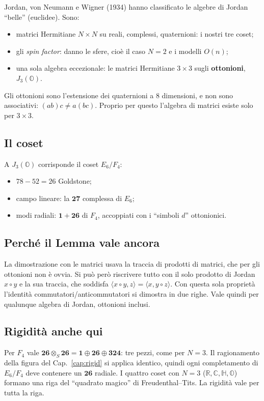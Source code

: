 \documentclass[11pt,a4paper]{article}
\numberwithin{equation}{section}
\theoremstyle{remark}
\newcommand{\R}{\mathbb{R}}
\begin{document}
Jordan, von Neumann e Wigner (1934) hanno classificato le algebre di Jordan ``belle'' (euclidee). Sono:
\begin{itemize}[nosep]
\item matrici Hermitiane $N\times N$ su reali, complessi, quaternioni: i nostri tre coset;
\item gli \emph{spin factor}: danno le sfere, cioè il caso $N=2$ e i modelli $O(n)$;
\item una sola algebra eccezionale: le matrici Hermitiane $3\times3$ sugli \textbf{ottonioni}, $J_3(\mathbb O)$.
\end{itemize}
Gli ottonioni sono l'estensione dei quaternioni a 8 dimensioni, e non sono associativi: $(ab)c\ne a(bc)$. Proprio per questo l'algebra di matrici esiste solo per $3\times3$.

\subsection{Il coset}

A $J_3(\mathbb O)$ corrisponde il coset $E_6/F_4$:
\begin{itemize}[nosep]
\item $78-52=26$ Goldstone;
\item campo lineare: la $\mathbf{27}$ complessa di $E_6$;
\item modi radiali: $\mathbf1+\mathbf{26}$ di $F_4$, accoppiati con i ``simboli $d$'' ottonionici.
\end{itemize}

\subsection{Perché il Lemma vale ancora}

La dimostrazione con le matrici usava la traccia di prodotti di matrici, che per gli ottonioni non è ovvia. Si può però riscrivere tutto con il solo prodotto di Jordan $x\circ y$ e la sua traccia, che soddisfa $\langle x\circ y,z\rangle=\langle x,y\circ z\rangle$. Con questa sola proprietà l'identità commutatori/anticommutatori si dimostra in due righe. Vale quindi per qualunque algebra di Jordan, ottonioni inclusi.

\subsection{Rigidità anche qui}

Per $F_4$ vale $\mathbf{26}\otimes_S\mathbf{26}=\mathbf1\oplus\mathbf{26}\oplus\mathbf{324}$: tre pezzi, come per $N=3$. Il ragionamento della figura del Cap.~\ref{cap:rigid} si applica identico, quindi ogni completamento di $E_6/F_4$ deve contenere un $\mathbf{26}$ radiale. I quattro coset con $N=3$ ($\R,\mathbb C,\mathbb H,\mathbb O$) formano una riga del ``quadrato magico'' di Freudenthal--Tits. La rigidità vale per tutta la riga.
\end{document}
